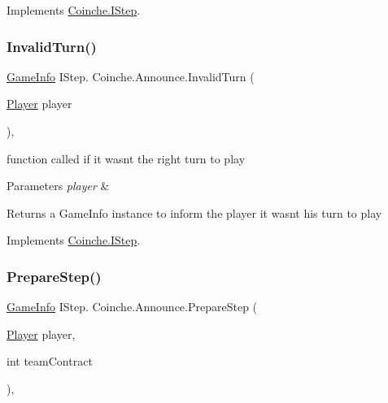 Implements \hyperlink{interface_coinche_1_1_i_step_a1b410159a7988ae4e75154539715e7ba}{Coinche.\+I\+Step}.

\mbox{\label{class_coinche_1_1_announce_a778b04cb7ff3405d1a182e445a7c8f4c}} 
\subsubsection{\texorpdfstring{Invalid\+Turn()}{InvalidTurn()}}
{\footnotesize\ttfamily \hyperlink{class_coinche_1_1_tools_1_1_game_info}{Game\+Info} I\+Step. Coinche.\+Announce.\+Invalid\+Turn (\begin{DoxyParamCaption}\item[{\hyperlink{class_coinche_1_1_player}{Player}}]{player }\end{DoxyParamCaption})\hspace{0.3cm}{\ttfamily [inline]}, {\ttfamily [private]}}



function called if it wasn\textquotesingle{}t the right turn to play 


\begin{DoxyParams}{Parameters}
{\em player} & \\
\hline
\end{DoxyParams}
\begin{DoxyReturn}{Returns}
a Game\+Info instance to inform the player it wasn\textquotesingle{}t his turn to play
\end{DoxyReturn}


Implements \hyperlink{interface_coinche_1_1_i_step_afc64813670860f5ee0829264751abc0a}{Coinche.\+I\+Step}.

\mbox{\label{class_coinche_1_1_announce_a24398cfbd8280465732c360858e72e13}} 
\subsubsection{\texorpdfstring{Prepare\+Step()}{PrepareStep()}}
{\footnotesize\ttfamily \hyperlink{class_coinche_1_1_tools_1_1_game_info}{Game\+Info} I\+Step. Coinche.\+Announce.\+Prepare\+Step (\begin{DoxyParamCaption}\item[{\hyperlink{class_coinche_1_1_player}{Player}}]{player,  }\item[{int}]{team\+Contract }\end{DoxyParamCaption})\hspace{0.3cm}{\ttfamily [inline]}, {\ttfamily [private]}}



